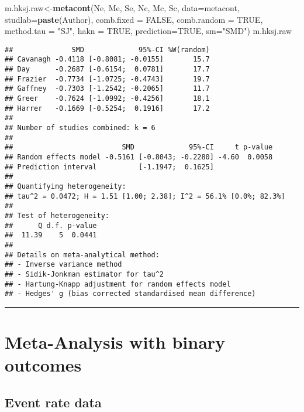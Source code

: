 \documentclass[]{book}
\newenvironment{Shaded}{\begin{snugshade}}{\end{snugshade}}
\newcommand{\KeywordTok}[1]{\textcolor[rgb]{0.13,0.29,0.53}{\textbf{#1}}}
\newcommand{\DataTypeTok}[1]{\textcolor[rgb]{0.13,0.29,0.53}{#1}}
\newcommand{\StringTok}[1]{\textcolor[rgb]{0.31,0.60,0.02}{#1}}
\newcommand{\OtherTok}[1]{\textcolor[rgb]{0.56,0.35,0.01}{#1}}
\newcommand{\NormalTok}[1]{#1}
\theoremstyle{definition}
\theoremstyle{definition}
\theoremstyle{definition}
\theoremstyle{remark}
\begin{document}
\begin{Shaded}
\begin{Highlighting}[]
\NormalTok{m.hksj.raw<-}\KeywordTok{metacont}\NormalTok{(Ne,}
\NormalTok{        Me,}
\NormalTok{        Se,}
\NormalTok{        Nc,}
\NormalTok{        Mc,}
\NormalTok{        Sc,}
        \DataTypeTok{data=}\NormalTok{metacont,}
        \DataTypeTok{studlab=}\KeywordTok{paste}\NormalTok{(Author),}
        \DataTypeTok{comb.fixed =} \OtherTok{FALSE}\NormalTok{,}
        \DataTypeTok{comb.random =} \OtherTok{TRUE}\NormalTok{,}
        \DataTypeTok{method.tau =} \StringTok{"SJ"}\NormalTok{,}
        \DataTypeTok{hakn =} \OtherTok{TRUE}\NormalTok{,}
        \DataTypeTok{prediction=}\OtherTok{TRUE}\NormalTok{,}
        \DataTypeTok{sm=}\StringTok{"SMD"}\NormalTok{)}
\NormalTok{m.hksj.raw}
\end{Highlighting}
\end{Shaded}

\begin{verbatim}
##              SMD             95%-CI %W(random)
## Cavanagh -0.4118 [-0.8081; -0.0155]       15.7
## Day      -0.2687 [-0.6154;  0.0781]       17.7
## Frazier  -0.7734 [-1.0725; -0.4743]       19.7
## Gaffney  -0.7303 [-1.2542; -0.2065]       11.7
## Greer    -0.7624 [-1.0992; -0.4256]       18.1
## Harrer   -0.1669 [-0.5254;  0.1916]       17.2
## 
## Number of studies combined: k = 6
## 
##                          SMD             95%-CI     t p-value
## Random effects model -0.5161 [-0.8043; -0.2280] -4.60  0.0058
## Prediction interval          [-1.1947;  0.1625]              
## 
## Quantifying heterogeneity:
## tau^2 = 0.0472; H = 1.51 [1.00; 2.38]; I^2 = 56.1% [0.0%; 82.3%]
## 
## Test of heterogeneity:
##      Q d.f. p-value
##  11.39    5  0.0441
## 
## Details on meta-analytical method:
## - Inverse variance method
## - Sidik-Jonkman estimator for tau^2
## - Hartung-Knapp adjustment for random effects model
## - Hedges' g (bias corrected standardised mean difference)
\end{verbatim}

\begin{center}\rule{0.5\linewidth}{\linethickness}\end{center}

\hypertarget{binary}{\section{Meta-Analysis with binary
outcomes}\label{binary}}

\subsection{Event rate data}\label{event-rate-data}
\end{document}
